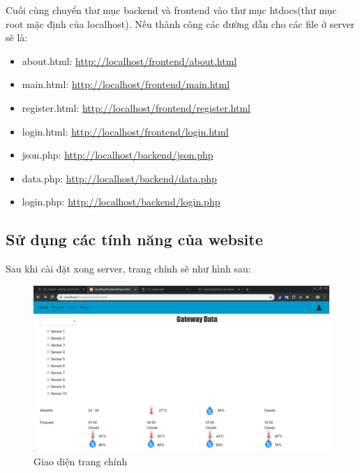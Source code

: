 \documentclass[a4paper]{article}
\begin{document}
    Cuối cùng chuyển thư mục backend và frontend vào thư mục htdocs(thư mục root mặc định của localhost). Nếu thành công các đường dẫn cho các file ở server sẽ là:
    \begin{itemize}
        \item about.html: \url{http://localhost/frontend/about.html}
        \item main.html: \url{http://localhost/frontend/main.html}
        \item register.html: \url{http://localhost/frontend/register.html}
        \item login.html:
        \url{http://localhost/frontend/login.html}
        \item json.php: \url{http://localhost/backend/json.php}
        \item data.php: \url{http://localhost/backend/data.php}
        \item login.php: \url{http://localhost/backend/login.php}
    \end{itemize}
    \subsection{Sử dụng các tính năng của website}
    Sau khi cài đặt xong server, trang chính sẽ như hình sau:
    \begin{figure}[htp]
        \centering
        \includegraphics[scale=0.3]{mainpage.png}
        \caption{Giao diện trang chính}
        \label{fig:my_label}
    \end{figure}
    
\end{document}
